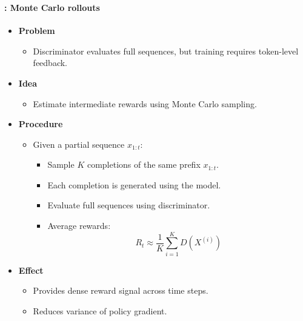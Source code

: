 \documentclass[xcolor=table]{beamer}
\begin{document}
	\begin{frame}
		\frametitle{\insertshortsubtitle}
		\framesubtitle{\insertsection: Monte Carlo rollouts}
		
		\begin{itemize}
			
			\item \textbf{Problem}
			\begin{itemize}
				\item Discriminator evaluates full sequences, but training requires token-level feedback.
			\end{itemize}
			
			\item \textbf{Idea}
			\begin{itemize}
				\item Estimate intermediate rewards using Monte Carlo sampling.
			\end{itemize}
			
			\item \textbf{Procedure}
			\begin{itemize}
				\item Given a partial sequence \(x_{1:t}\):
				\begin{itemize}
					\item Sample \(K\) completions of the same prefix \(x_{1:t}\).
					\item Each completion is generated using the model.
					\item Evaluate full sequences using discriminator.
					\item Average rewards:
					\[
					R_t \approx \frac{1}{K} \sum_{i=1}^{K} D(X^{(i)})
					\]
				\end{itemize}
			\end{itemize}
			
			\item \textbf{Effect}
			\begin{itemize}
				\item Provides dense reward signal across time steps.
				\item Reduces variance of policy gradient.
			\end{itemize}
			
		\end{itemize}
		
	\end{frame}
	
\end{document}
